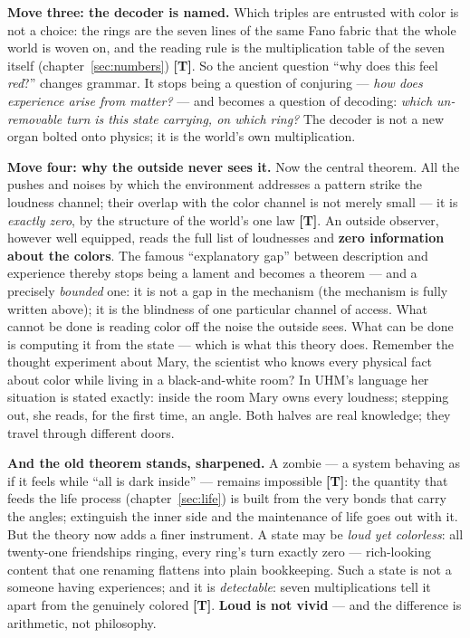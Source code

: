 \documentclass[11pt,letterpaper]{article}
\newcommand{\stT}{\textbf{[T]}\xspace}
\begin{document}
\textbf{Move three: the decoder is named.} Which triples are
entrusted with color is not a choice: the rings are the seven lines
of the same Fano fabric that the whole world is woven on, and the
reading rule is the multiplication table of the seven itself
(chapter~\ref{sec:numbers}) \stT. So the ancient question ``why does
this feel \emph{red}?'' changes grammar. It stops being a question of
conjuring --- \emph{how does experience arise from matter?} --- and
becomes a question of decoding: \emph{which un-removable turn is this
state carrying, on which ring?} The decoder is not a new organ
bolted onto physics; it is the world's own multiplication.

\textbf{Move four: why the outside never sees it.} Now the central
theorem. All the pushes and noises by
which the environment addresses a pattern strike the loudness
channel; their overlap with the color channel is not merely small ---
it is \emph{exactly zero}, by the structure of the world's one law
\stT. An outside observer, however well equipped, reads the full
list of loudnesses and \textbf{zero information about the colors}.
The famous ``explanatory gap'' between description and experience
thereby stops being a lament and becomes a theorem --- and a
precisely \emph{bounded} one: it is not a gap in the mechanism (the
mechanism is fully written above); it is the blindness of one
particular channel of access. What cannot be done is reading color
off the noise the outside sees. What can be done is computing it
from the state --- which is what this theory does. Remember the
thought experiment about Mary, the scientist who knows every
physical fact about color while living in a black-and-white room?
In UHM's language her situation is stated exactly: inside the room
Mary owns every loudness; stepping out, she reads, for the first
time, an angle. Both halves are real knowledge; they travel through
different doors.

\textbf{And the old theorem stands, sharpened.} A zombie ---
a system behaving as if it feels while ``all is dark inside'' ---
remains impossible \stT: the quantity that feeds the life process
(chapter~\ref{sec:life}) is built from the very bonds that carry the
angles; extinguish the inner side and the maintenance of life goes
out with it. But the theory now adds a finer instrument. A state may
be \emph{loud yet colorless}: all twenty-one friendships ringing,
every ring's turn exactly zero --- rich-looking content that one
renaming flattens into plain bookkeeping. Such a state is not a
someone having experiences; and it is \emph{detectable}: seven
multiplications tell it apart from the genuinely colored \stT.
\textbf{Loud is not vivid} --- and the difference is arithmetic, not
philosophy.
\end{document}
